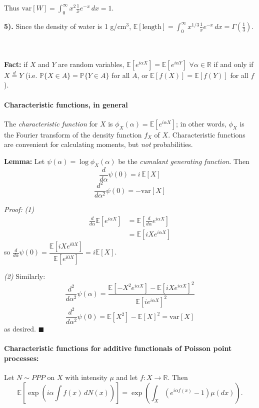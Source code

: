 \documentclass{article}
\begin{document}
Thus $\textrm{var}[W]=\int_0^\infty x^2\frac{1}{x}e^{-x}\,dx=1$.

\textbf{5).} Since the density of water is 1 g/$\textrm{cm}^3$, $\mathbb{E}[\textrm{length}]=\int_0^\infty x^{1/3}\frac{1}{x}e^{-x}\,dx=\Gamma(\frac{1}{3})$.

\hrulefill\\\\

\textbf{Fact:} if $X$ and $Y$ are random variables, $\mathbb{E}[e^{i\alpha X}]=\mathbb{E}[e^{i\alpha Y}]$ $\forall \alpha\in\mathbb{R}$ if and only if $X\overset{d}{=}Y$ (i.e. $\mathbb{P}\{X\in A\}=\mathbb{P}\{Y\in A\}$ for all $A$, or $\mathbb{E}[f(X)]=\mathbb{E}[f(Y)]$ for all $f$).\\

\paragraph{Characteristic functions, in general}
The \emph{characteristic function} for $X$ is $\phi_X(\alpha)=\mathbb{E}[e^{i\alpha X}]$; in other words, $\phi_X$ is the Fourier transform of the density function $f_X$ of $X$.
Characteristic functions are convenient for calculating moments, but \emph{not} probabilities.

\textbf{Lemma:} Let $\psi (\alpha)=\log\phi_X(\alpha)$ be the \emph{cumulant generating function}. 
Then 
$$\frac{d}{d\alpha}\psi(0)=i\,\mathbb{E}[X]$$
$$\frac{d^2}{d\alpha^2}\psi(0)=-\textrm{var}[X]$$

\textit{Proof:} \emph{(1)} 
$$\begin{split}
    \frac{d}{d\alpha}\mathbb{E}[e^{i\alpha X}]&=\mathbb{E}\left[\frac{d}{d\alpha}e^{i\alpha X}\right]\\
        &=\mathbb{E}[iXe^{i\alpha X}]
\end{split}$$
so $\frac{d}{d\alpha}\psi(0)=\dfrac{\mathbb{E}[iXe^{i0 X}]}{\mathbb{E}[e^{i0 X}]}=i\mathbb{E}[X]$.

\emph{(2)} Similarly:
$$\frac{d^2}{d\alpha^2}\psi(\alpha)=\frac{ \mathbb{E}[-X^2e^{i\alpha X}]-\mathbb{E}[iXe^{i\alpha X}]^2   }{\mathbb{E}[ie^{i\alpha X}]^2}$$
$$\frac{d^2}{d\alpha^2}\psi(0)
    =\mathbb{E}[X^2]-\mathbb{E}[X]^2
    =\textrm{var}[X]$$
as desired. $\blacksquare$
\newline



\paragraph{Characteristic functions for additive functionals of Poisson point processes:} 
Let $N\sim PPP$ on $X$ with intensity $\mu$ and let $f:X\rightarrow\mathbb{R}$. 
Then $$\mathbb{E}\left[\exp\left(i\alpha\int f(x)\,dN(x)\right)\right]=\exp\left(\int_X (e^{i\alpha f(x)}-1)\mu(dx) \right).$$
\end{document}
